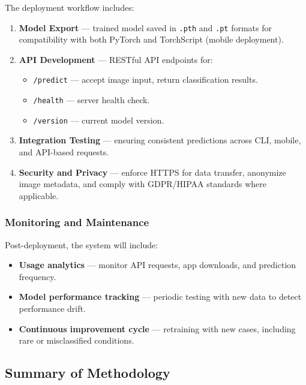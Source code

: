 \documentclass[
  12pt,
  oneside]{article}
\providecommand{\tightlist}{%
  \setlength{\itemsep}{0pt}\setlength{\parskip}{0pt}}
\begin{document}
The deployment workflow includes:

\begin{enumerate}
\def\labelenumi{\arabic{enumi}.}
\item
  \textbf{Model Export} --- trained model saved in \texttt{.pth} and
  \texttt{.pt} formats for compatibility with both PyTorch and
  TorchScript (mobile deployment).
\item
  \textbf{API Development} --- RESTful API endpoints for:

  \begin{itemize}
  \tightlist
  \item
    \texttt{/predict} --- accept image input, return classification
    results.
  \item
    \texttt{/health} --- server health check.
  \item
    \texttt{/version} --- current model version.
  \end{itemize}
\item
  \textbf{Integration Testing} --- ensuring consistent predictions
  across CLI, mobile, and API-based requests.
\item
  \textbf{Security and Privacy} --- enforce HTTPS for data transfer,
  anonymize image metadata, and comply with GDPR/HIPAA standards where
  applicable.
\end{enumerate}

\subsubsection{Monitoring and
Maintenance}\label{monitoring-and-maintenance}

Post-deployment, the system will include:

\begin{itemize}
\tightlist
\item
  \textbf{Usage analytics} --- monitor API requests, app downloads, and
  prediction frequency.
\item
  \textbf{Model performance tracking} --- periodic testing with new data
  to detect performance drift.
\item
  \textbf{Continuous improvement cycle} --- retraining with new cases,
  including rare or misclassified conditions.
\end{itemize}

\subsection{Summary of Methodology}\label{summary-of-methodology}
\end{document}
